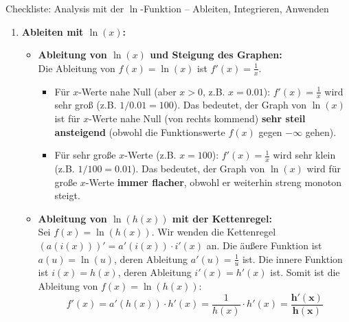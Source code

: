 \begin{loesungsumgebung}{Checkliste: Analysis mit der $\ln$-Funktion – Ableiten, Integrieren, Anwenden}

\begin{enumerate}[label=(\alph*)]
    \item \textbf{Ableiten mit $\ln(x)$:}
    \begin{itemize}
        \item \textbf{Ableitung von $\ln(x)$ und Steigung des Graphen:} \\
        Die Ableitung von $f(x)=\ln(x)$ ist $f'(x)=\frac{1}{x}$.
        \begin{itemize}
            \item Für $x$-Werte nahe Null (aber $x>0$, z.B. $x=0.01$): $f'(x) = \frac{1}{x}$ wird sehr groß (z.B. $1/0.01 = 100$). Das bedeutet, der Graph von $\ln(x)$ ist für $x$-Werte nahe Null (von rechts kommend) \textbf{sehr steil ansteigend} (obwohl die Funktionswerte $f(x)$ gegen $-\infty$ gehen).
            \item Für sehr große $x$-Werte (z.B. $x=100$): $f'(x) = \frac{1}{x}$ wird sehr klein (z.B. $1/100 = 0.01$). Das bedeutet, der Graph von $\ln(x)$ wird für große $x$-Werte \textbf{immer flacher}, obwohl er weiterhin streng monoton steigt.
        \end{itemize}

        \item \textbf{Ableitung von $\ln(h(x))$ mit der Kettenregel:} \\
        Sei $f(x) = \ln(h(x))$. Wir wenden die Kettenregel $(a(i(x)))' = a'(i(x)) \cdot i'(x)$ an.
        Die äußere Funktion ist $a(u) = \ln(u)$, deren Ableitung $a'(u) = \frac{1}{u}$ ist.
        Die innere Funktion ist $i(x) = h(x)$, deren Ableitung $i'(x) = h'(x)$ ist.
        Somit ist die Ableitung von $f(x) = \ln(h(x))$:
        $$ f'(x) = a'(h(x)) \cdot h'(x) = \frac{1}{h(x)} \cdot h'(x) = \mathbf{\frac{h'(x)}{h(x)}} $$
    \end{itemize}


\end{enumerate}
\end{loesungsumgebung}
